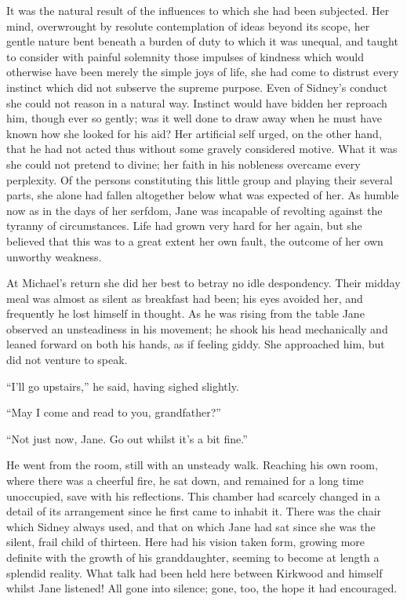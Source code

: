 It was the natural result of the influences to which she had been
subjected. Her mind, overwrought by resolute contemplation of ideas
beyond its scope, her gentle nature bent {}beneath a burden of duty to
which it was unequal, and taught to consider with painful solemnity
those impulses of kindness which would otherwise have been merely the
simple joys of life, she had come to distrust every instinct which did
not subserve the supreme purpose. Even of Sidney's conduct she could not
reason in a natural way. Instinct would have bidden her reproach him,
though ever so gently; was it well done to draw away when he must have
known how she looked for his aid? Her artificial self urged, on the
other hand, that he had not acted thus without some gravely considered
motive. What it was she could not pretend to divine; her faith in his
nobleness overcame every perplexity. Of the persons constituting this
little group and playing their several parts, she alone had fallen
altogether below what was expected of her. As humble now as in the days
of her serfdom, Jane was incapable of revolting against the tyranny of
circumstances. Life had grown very hard for her again, but she believed
that this was to a great extent her own fault, the outcome of her own
unworthy weakness.

{}At Michael's return she did her best to betray no idle despondency.
Their midday meal was almost as silent as breakfast had been; his eyes
avoided her, and frequently he lost himself in thought. As he was rising
from the table Jane observed an unsteadiness in his movement; he shook
his head mechanically and leaned forward on both his hands, as if
feeling giddy. She approached him, but did not venture to speak.

``I'll go upstairs,'' he said, having sighed slightly.

``May I come and read to you, grandfather?''

``Not just now, Jane. Go out whilst it's a bit fine.''

He went from the room, still with an unsteady walk. Reaching his own
room, where there was a cheerful fire, he sat down, and remained for a
long time unoccupied, save with his reflections. This chamber had
scarcely changed in a detail of its arrangement since he first came to
inhabit it. There was the chair which Sidney always used, and that on
which Jane had sat since she was the silent, frail child of thirteen.
Here had his vision taken form, growing more definite with the growth of
his {}granddaughter, seeming to become at length a splendid reality.
What talk had been held here between Kirkwood and himself whilst Jane
listened! All gone into silence; gone, too, the hope it had encouraged.

